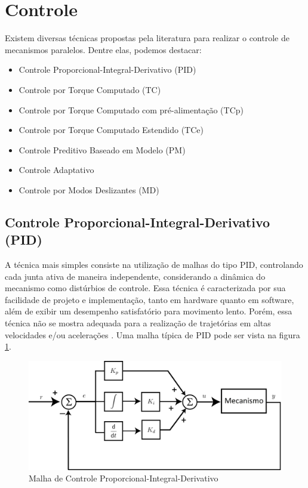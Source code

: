 \documentclass[]{politex}
\begin{document}
\section{Controle}

Existem diversas técnicas propostas pela literatura para realizar o controle de mecanismos paralelos. Dentre elas, podemos destacar:

\begin{itemize}
\item Controle Proporcional-Integral-Derivativo (PID)
\item Controle por Torque Computado (TC)
\item Controle por Torque Computado com pré-alimentação (TCp)
\item Controle por Torque Computado Estendido (TCe)
\item Controle Preditivo Baseado em Modelo (PM)
\item Controle Adaptativo
\item Controle por Modos Deslizantes (MD)
\end{itemize}

\subsection{Controle Proporcional-Integral-Derivativo (PID)}

A técnica mais simples consiste na utilização de malhas do tipo PID, controlando cada junta ativa de maneira independente, considerando a dinâmica do mecanismo como distúrbios de controle. Essa técnica é caracterizada por sua facilidade de projeto e implementação, tanto em hardware quanto em software, além de exibir um desempenho satisfatório para movimento lento. Porém, essa técnica não se mostra adequada para a realização de trajetórias em altas velocidades e/ou acelerações \cite{Honegger, Zubizarreta}. Uma malha típica de PID pode ser vista na figura \ref{fig:PID}.

\begin{figure}[h]
	\centering
	\includegraphics[scale=0.45]{../figures/PID.jpg}  
	\caption{Malha de Controle Proporcional-Integral-Derivativo}
	\label{fig:PID}
\end{figure}
\end{document}
